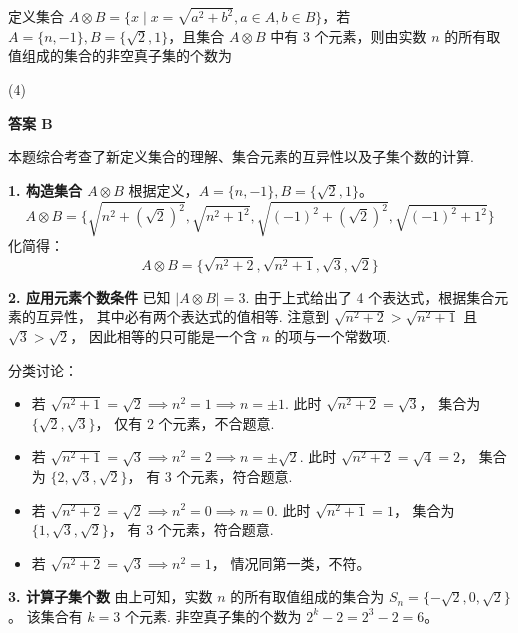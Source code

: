 \begin{choice}[source={2024 秋 · 高一 · 福建龙岩 · 开学考试校考}, topic={新定义集合与元素互异性}]
定义集合 $A \otimes B = \{x \mid x=\sqrt{a^2+b^2}, a \in A, b \in B\}$，若 $A=\{n, -1\}, B=\{\sqrt{2}, 1\}$，且集合 $A \otimes B$ 中有 3 个元素，则由实数 $n$ 的所有取值组成的集合的非空真子集的个数为
\begin{tasks}(4)
\end{tasks}
\end{choice}
\begin{choice-sol}
\textbf{答案 B}

本题综合考查了新定义集合的理解、集合元素的互异性以及子集个数的计算.

\textbf{1. 构造集合 $A \otimes B$}
根据定义，$A=\{n, -1\}, B=\{\sqrt{2}, 1\}$。
\[ A \otimes B = \{\sqrt{n^2 + (\sqrt{2})^2}, \sqrt{n^2 + 1^2}, \sqrt{(-1)^2 + (\sqrt{2})^2}, \sqrt{(-1)^2 + 1^2}\} \]
化简得：
\[ A \otimes B = \{\sqrt{n^2+2}, \sqrt{n^2+1}, \sqrt{3}, \sqrt{2}\} \]

\textbf{2. 应用元素个数条件}
已知 $\lvert A \otimes B\rvert = 3$.
由于上式给出了 4 个表达式，根据集合元素的互异性，
其中必有两个表达式的值相等.
注意到 $\sqrt{n^2+2} > \sqrt{n^2+1}$ 且 $\sqrt{3} > \sqrt{2}$，
因此相等的只可能是一个含 $n$ 的项与一个常数项.

分类讨论：
\begin{itemize}
	\item 若 $\sqrt{n^2+1} = \sqrt{2} \implies n^2=1 \implies n=\pm 1$.
	此时 $\sqrt{n^2+2}=\sqrt{3}$，
	集合为 $\{\sqrt{2}, \sqrt{3}\}$，
	仅有 2 个元素，不合题意.
	\item 若 $\sqrt{n^2+1} = \sqrt{3} \implies n^2=2 \implies n=\pm \sqrt{2}$.
	此时 $\sqrt{n^2+2}=\sqrt{4}=2$，
	集合为 $\{2, \sqrt{3}, \sqrt{2}\}$，
	有 3 个元素，符合题意.
	\item 若 $\sqrt{n^2+2} = \sqrt{2} \implies n^2=0 \implies n=0$.
	此时 $\sqrt{n^2+1}=1$，
	集合为 $\{1, \sqrt{3}, \sqrt{2}\}$，
	有 3 个元素，符合题意.
	\item 若 $\sqrt{n^2+2} = \sqrt{3} \implies n^2=1$，
	情况同第一类，不符。
\end{itemize}

\textbf{3. 计算子集个数}
由上可知，实数 $n$ 的所有取值组成的集合为
$S_n = \{-\sqrt{2}, 0, \sqrt{2}\}$。
该集合有 $k=3$ 个元素.
非空真子集的个数为 $2^k - 2 = 2^3 - 2 = 6$。
\end{choice-sol}
